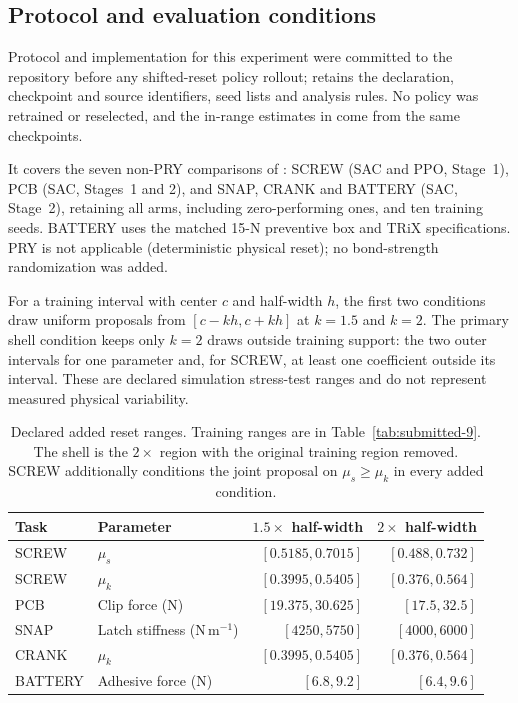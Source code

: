 \documentclass[10pt]{article}
\begin{document}
\subsection{Protocol and evaluation conditions}

Protocol and implementation for this experiment were committed to the repository before any shifted-reset policy rollout; 
retains the declaration, checkpoint and source identifiers, seed lists
and analysis rules. No policy was retrained or reselected, and the in-range estimates in  come from the same checkpoints.

It covers the seven non-PRY comparisons of : SCREW
(SAC and PPO, Stage~1), PCB (SAC, Stages~1 and 2), and SNAP, CRANK and
BATTERY (SAC, Stage~2), retaining all arms, including zero-performing ones, and ten training seeds.
BATTERY uses the matched 15-N preventive box and TRiX specifications. PRY is not applicable (deterministic
physical reset); no bond-strength randomization was added.

For a training interval with center $c$ and half-width $h$, the first two
conditions draw uniform proposals from $[c-kh,c+kh]$ at $k=1.5$ and $k=2$.
The primary shell condition keeps only $k=2$ draws outside training
support: the two outer intervals for one parameter and, for SCREW, at
least one coefficient outside its interval. These are declared simulation stress-test ranges and do not represent measured physical variability.

\begin{table}[!htbp]
\centering\small
\caption{Declared added reset ranges. Training ranges are in
Table~\ref{tab:submitted-9}. The shell is the $2\times$ region with the original
training region removed. SCREW additionally conditions the joint proposal on
$\mu_s\geq\mu_k$ in every added condition.}
\label{tab:ood-ranges}
\begin{tabular}{@{}llrr@{}}
\toprule Task & Parameter & $1.5\times$ half-width & $2\times$ half-width\\
\midrule
SCREW & $\mu_s$ & $[0.5185,0.7015]$ & $[0.488,0.732]$\\
SCREW & $\mu_k$ & $[0.3995,0.5405]$ & $[0.376,0.564]$\\
PCB & Clip force (N) & $[19.375,30.625]$ & $[17.5,32.5]$\\
SNAP & Latch stiffness (N\,m$^{-1}$) & $[4250,5750]$ & $[4000,6000]$\\
CRANK & $\mu_k$ & $[0.3995,0.5405]$ & $[0.376,0.564]$\\
BATTERY & Adhesive force (N) & $[6.8,9.2]$ & $[6.4,9.6]$\\
\bottomrule
\end{tabular}
\end{table}
\end{document}
